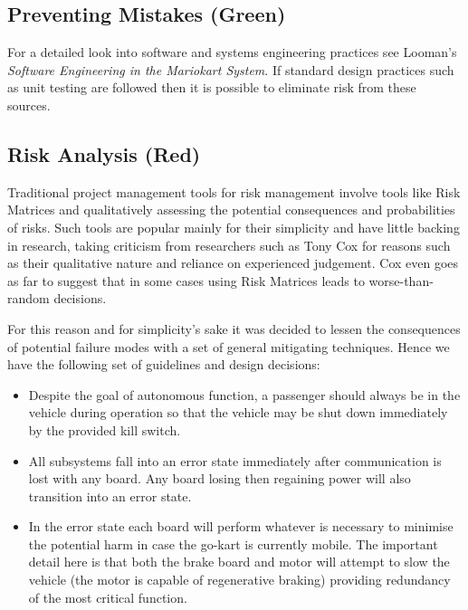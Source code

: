 \subsection{Preventing Mistakes (Green)}
For a detailed look into software and systems engineering practices see 
Looman's \emph{Software Engineering in the Mariokart System}\cite{
Looman_2011}. If standard design practices
such as unit testing are followed then it is possible to eliminate risk from these sources. 

\subsection{Risk Analysis (Red)}
Traditional project management tools for risk management involve tools
like Risk Matrices and qualitatively assessing the potential consequences and
probabilities of risks. Such tools are popular mainly for their simplicity
and have little backing in research, taking criticism from researchers such
as Tony Cox\cite{cox} for reasons such as their qualitative nature and reliance
on experienced judgement. Cox even goes as far to suggest that in some cases
using Risk Matrices leads to worse-than-random decisions.

For this reason and for simplicity's sake it was decided to lessen the consequences of
potential failure modes with a set of general mitigating techniques. Hence we have 
the following set of guidelines and design decisions:

\begin{itemize}
\item Despite the goal of autonomous function, a passenger should always be in
the vehicle during operation so that the vehicle may be shut down immediately 
by the provided kill switch.

\item All subsystems fall into an error state immediately after communication is
lost with any board. Any board losing then regaining power will also transition 
into an error state.

\item In the error state each board will perform whatever is necessary to minimise
the potential harm in case the go-kart is currently mobile. The important detail here
is that both the brake board and motor will attempt to slow the vehicle (the motor
is capable of regenerative braking) providing redundancy of the most critical function.

\end{itemize}
 


